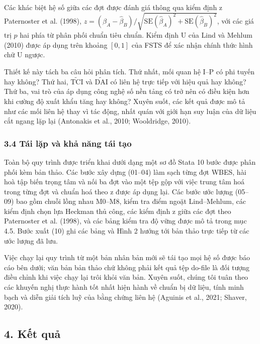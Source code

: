\documentclass[12pt,a4paper]{article}
\begin{document}
Các khác biệt hệ số giữa các đợt được đánh giá thông qua kiểm định z
Paternoster et al. (1998),
\(z = (\hat\beta_A - \hat\beta_B)/\sqrt{\mathrm{SE}(\hat\beta_A)^2 + \mathrm{SE}(\hat\beta_B)^2}\),
với các giá trị \(p\) hai phía từ phân phối chuẩn tiêu chuẩn. Kiểm định
U của Lind và Mehlum (2010) được áp dụng trên khoảng \([0, 1]\) của FSTS
để xác nhận chính thức hình chữ U ngược.

Thiết kế này tách ba câu hỏi phân tích. Thứ nhất, mối quan hệ I--P có
phi tuyến hay không? Thứ hai, \(\tilde{\mathrm{TCI}}\) và
\(\tilde{\mathrm{DAI}}\) có liên hệ trực tiếp với hiệu quả hay không?
Thứ ba, vai trò của áp dụng công nghệ số nền tảng có trở nên có điều
kiện hơn khi cường độ xuất khẩu tăng hay không? Xuyên suốt, các kết quả
được mô tả như các mối liên hệ thay vì tác động, nhất quán với giới hạn
suy luận của dữ liệu cắt ngang lặp lại (Antonakis et al., 2010;
Wooldridge, 2010).

\hypertarget{34-tuxe1i-lux1eb7p-vuxe0-khux1ea3-nux103ng-tuxe1i-tux1ea1o}{%
\subsubsection{3.4 Tái lặp và khả năng tái
tạo}\label{34-tuxe1i-lux1eb7p-vuxe0-khux1ea3-nux103ng-tuxe1i-tux1ea1o}}

Toàn bộ quy trình được triển khai dưới dạng một sơ đồ Stata 10 bước được
phân phối kèm bản thảo. Các bước xây dựng (01--04) làm sạch từng đợt
WBES, hài hoà tập biến trọng tâm và nối ba đợt vào một tệp gộp với việc
trung tâm hoá trong từng đợt và chuẩn hoá theo z được áp dụng lại. Các
bước ước lượng (05--09) bao gồm chuỗi lồng nhau M0--M8, kiểm tra điểm
ngoặt Lind--Mehlum, các kiểm định chọn lựa Heckman thủ công, các kiểm
định z giữa các đợt theo Paternoster et al. (1998), và các bảng kiểm tra
độ vững được mô tả trong mục 4.5. Bước xuất (10) ghi các bảng và Hình 2
hướng tới bản thảo trực tiếp từ các ước lượng đã lưu.

Việc chạy lại quy trình từ một bản nhân bản mới sẽ tái tạo mọi hệ số
được báo cáo bên dưới; văn bản bản thảo chứ không phải kết quả tệp
do-file là đối tượng điều chỉnh khi việc chạy lại trôi khỏi văn bản.
Xuyên suốt, chúng tôi tuân theo các khuyến nghị thực hành tốt nhất hiện
hành về chuẩn bị dữ liệu, tính minh bạch và diễn giải tích luỹ của bằng
chứng liên hệ (Aguinis et al., 2021; Shaver, 2020).

\hypertarget{4-kux1ebft-quux1ea3}{%
\subsection{4. Kết quả}\label{4-kux1ebft-quux1ea3}}
\end{document}
